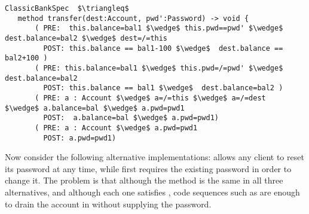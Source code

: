 \begin{lstlisting}[mathescape=true, frame=lines, language=Chainmail]
ClassicBankSpec  $\triangleq$
   method transfer(dest:Account, pwd':Password) -> void {
       ( PRE:  this.balance=bal1 $\wedge$ this.pwd==pwd' $\wedge$ dest.balance=bal2 $\wedge$ dest=/=this 
         POST: this.balance == bal1-100 $\wedge$  dest.balance == bal2+100 )
       ( PRE: this.balance=bal1 $\wedge$ this.pwd=/=pwd' $\wedge$ dest.balance=bal2
         POST: this.balance == bal1 $\wedge$  dest.balance=bal2 )
       ( PRE: a : Account $\wedge$ a=/=this $\wedge$ a=/=dest  $\wedge$ a.balance=bal $\wedge$ a.pwd=pwd1
         POST:  a.balance=bal $\wedge$ a.pwd=pwd1)
       ( PRE: a : Account $\wedge$ a.pwd=pwd1  
         POST: a.pwd=pwd1)       
\end{lstlisting}
 
 

Now consider the following alternative implementations:
 allows any client to reset its password at any time, while
 first requires the existing password in order to change it.
The problem is that although the  method is the same in
all three alternatives, and although each one satisfies ,
code sequences such as
%
%
are enough to drain the account in  without supplying the password.


  
%
  
